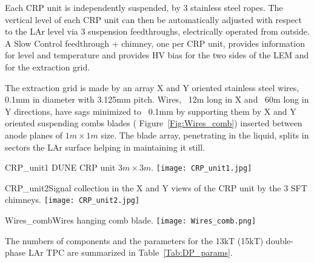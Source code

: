Each CRP unit is independently suspended,  by 3 stainless steel ropes. The  vertical level of each CRP unit can then be automatically adjusted with respect to the LAr level via 3 suspension feedthroughs, electrically operated from outside. A Slow Control feedthrough + chimney, one per CRP unit, provides  information for level and temperature and provides HV bias for the two sides of the LEM  and for the extraction grid.

The extraction grid is made by an array X and Y oriented stainless steel wires, 0.1mm in diameter with 3.125mm pitch. 
Wires, ~12m long in X and ~60m long in Y directions, have sags minimized to ~0.1mm by supporting them by X and Y oriented suspending combs blades ( Figure~\ref{Fig:Wires_comb}) inserted between anode planes of $1m \times 1m$ size. The blade array, penetrating in the liquid, splits in sectors the LAr surface helping in maintaining it still.

\begin{cdrfigure}{CRP_unit1}{ DUNE CRP unit $3m\times 3m$.}
\texttt{[image: CRP\_unit1.jpg]}
\end{cdrfigure}

\begin{cdrfigure}{CRP_unit2}{Signal collection in the X and Y views of the CRP unit by the 3 SFT chimneys.}
\texttt{[image: CRP\_unit2.jpg]}
\end{cdrfigure}

\begin{cdrfigure}{Wires_comb}{Wires hanging comb blade.}
\texttt{[image: Wires\_comb.png]}
\end{cdrfigure}

The numbers of components and the parameters for the 13kT (15kT) double-phase  LAr TPC are summarized in Table~\ref{Tab:DP_params}.

